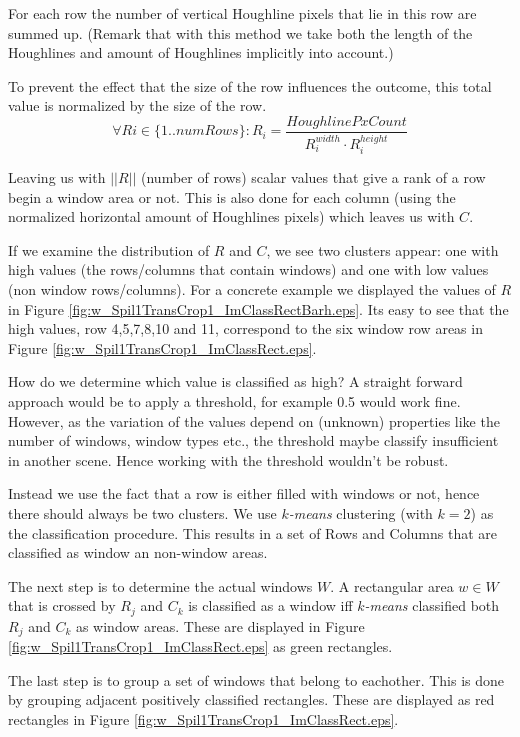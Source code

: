 For each row the number of vertical Houghline pixels that lie in this row are summed up.
(Remark that with this method we take both the length of the Houghlines and amount of Houghlines 
implicitly into account.)

To prevent the effect that the size of the row influences the outcome, this total value
is normalized by the size of the row.
\[\forall Ri\in \{1..numRows\} : R_i = \frac{HoughlinePxCount}{R_i^{width} \cdot R_i^{height}}\]

Leaving us with $||R||$ (number of rows) scalar values that give a rank of a row begin a window area or not.
This is also done for each column (using the normalized horizontal amount of
Houghlines pixels) which leaves us with $C$.

If we examine the distribution of $R$ and $C$, we see two clusters appear: one with
high values (the rows/columns that contain windows) and one with low values (non window
rows/columns). For a concrete example we displayed the values of $R$ in Figure \ref{fig:w_Spil1TransCrop1_ImClassRectBarh.eps}.
Its easy to see that the high values, row 4,5,7,8,10 and 11, correspond to the
six window row areas in Figure \ref{fig:w_Spil1TransCrop1_ImClassRect.eps}.

How do we determine which value is classified as high?  A straight forward
approach would be to apply a threshold, for example 0.5 would work fine.
However, as the variation of the values depend on (unknown) properties like the
number of windows, window types etc., the threshold maybe classify insufficient
in another scene.  Hence working with the threshold wouldn't be robust. 

Instead we use the fact that a row is either filled with windows or not, hence
there should always be two clusters.  We use \emph{$k$-means} clustering (with
$k=2$) as the classification procedure.
This results in a set of Rows and Columns that are classified as window an
non-window areas.

The next step is to determine the actual windows $W$.
A rectangular area $w\in W$ that is crossed by $R_j$ and $C_k$ is classified as a
window iff \emph{$k$-means} classified both $R_j$ and $C_k$ as window areas. These are displayed in 
 Figure \ref{fig:w_Spil1TransCrop1_ImClassRect.eps} as green rectangles.

The last step is to group a set of windows that belong to eachother. This is done by 
grouping adjacent positively classified rectangles. These are displayed as red
rectangles in Figure \ref{fig:w_Spil1TransCrop1_ImClassRect.eps}.

